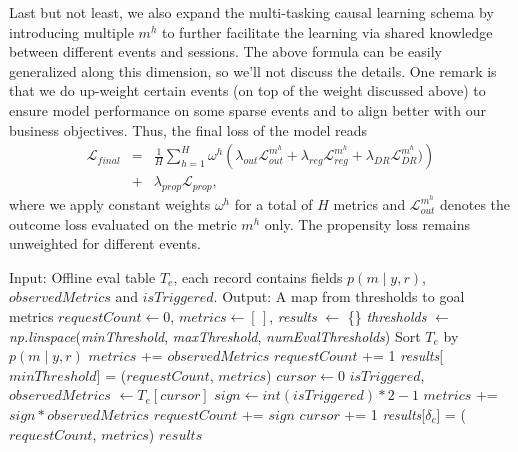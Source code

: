 \documentclass[sigconf, authorversion]{acmart}
\begin{document}
Last but not least, we also expand the multi-tasking causal learning schema by introducing multiple $m^{h}$ to further facilitate the learning via shared knowledge between different events and sessions. The above formula can be easily generalized along this dimension, so we'll not discuss the details. One remark is that we do up-weight certain events (on top of the weight discussed above) to ensure model performance on some sparse events and to align better with our business objectives. Thus, the final loss of the model reads
\begin{eqnarray} \nonumber
    \mathcal{L}_{final} &=& \frac{1}{H}\sum_{h=1}^{H}\omega^h \left(\lambda_{out} \mathcal{L}_{out}^{m^{h}}+ \lambda_{reg} \mathcal{L}_{reg}^{m^{h}} + \lambda_{DR} \mathcal{L}_{DR}^{m^{h}})\right) \\
    &+& \lambda_{prop} \mathcal{L}_{prop},
\end{eqnarray}
where we apply constant weights $\omega^h$ for a total of $H$ metrics and $\mathcal{L}_{out}^{m^{h}}$ denotes the outcome loss evaluated on the metric $m^{h}$ only. The propensity loss remains unweighted for different events.

\begin{algorithm}
  \caption{Offline replay evaluation}
  \label{alg:offline_replay}
  \begin{algorithmic}[1]
    \State Input: Offline eval table $T_e$, each record contains fields $p(m\mid y,r)$, $observedMetrics$ and $isTriggered$.
    \State Output: A map from thresholds to goal metrics
    \State
    \State $ \textit{requestCount} \gets 0$, $ \textit{metrics} \gets [\,]$, \textit{results} $\gets$ \{\}
    \State  \textit{thresholds} $\gets$ \textit{np.linspace}(\textit{minThreshold}, \textit{maxThreshold}, \textit{numEvalThresholds})
    \State Sort $T_e$ by $p(m \mid y,r)$
    \State
            \State $metrics$ += $observedMetrics$
            \State $requestCount$ += 1 
        \EndIf
    \EndFor
   \State \textit{results}[$minThreshold$] = ($requestCount$, $metrics$)
    \State
    \State $cursor \gets 0$
        \State $isTriggered$,  $observedMetrics$ $\gets T_e[cursor]$
        \State $sign \gets int(isTriggered)*2-1$ 
        \State $metrics$ += $sign*observedMetrics$
        \State $requestCount$ += $sign$
        \State $cursor$ += 1
      \EndWhile
      \State \textit{results}[$\delta_c$] = ($requestCount$, $metrics$)
    \EndFor
    \State \Return $results$
  \end{algorithmic}
\end{algorithm}
\end{document}
